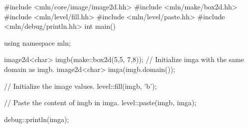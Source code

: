 #include <mln/core/image/image2d.hh>
#include <mln/make/box2d.hh>
#include <mln/level/fill.hh>
#include <mln/level/paste.hh>
#include <mln/debug/println.hh>
int main()
{
  using namespace mln;

  image2d<char> imgb(make::box2d(5,5, 7,8));
  // Initialize imga with the same domain as imgb.
  image2d<char> imga(imgb.domain());

  // Initialize the image values.
  level::fill(imgb, 'b');

  // Paste the content of imgb in imga.
  level::paste(imgb, imga);

  debug::println(imga);
}
